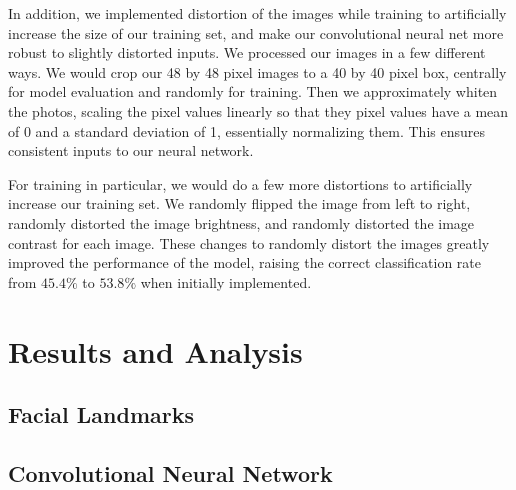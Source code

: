\documentclass[11pt, twocolumn, twoside]{article}
\begin{document}
In addition, we implemented distortion of the images while training to artificially increase the size of our training set, and make our convolutional neural net more robust to slightly distorted inputs. We processed our images in a few different ways. We would crop our 48 by 48 pixel images to a 40 by 40 pixel box, centrally for model evaluation and randomly for training. Then we approximately whiten the photos, scaling the pixel values linearly so that they pixel values have a mean of 0 and a standard deviation of 1, essentially normalizing them. This ensures consistent inputs to our neural network.

For training in particular, we would do a few more distortions to artificially increase our training set. We randomly flipped the image from left to right, randomly distorted the image brightness, and 	randomly distorted the image contrast for each image. These changes to randomly distort the images greatly improved the performance of the model, raising the correct classification rate from $45.4\%$ to $53.8\%$ when initially implemented.

\section{Results and Analysis}

\subsection{Facial Landmarks}

\subsection{Convolutional Neural Network}
\end{document}
